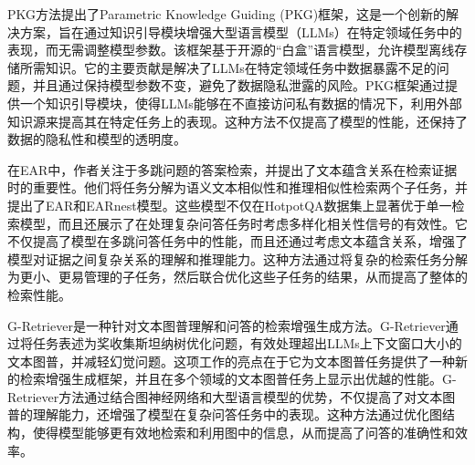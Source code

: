 PKG\cite{luoAugmentedLargeLanguage2023}方法提出了Parametric Knowledge Guiding (PKG)框架，这是一个创新的解决方案，旨在通过知识引导模块增强大型语言模型（LLMs）在特定领域任务中的表现，而无需调整模型参数。该框架基于开源的“白盒”语言模型，允许模型离线存储所需知识。它的主要贡献是解决了LLMs在特定领域任务中数据暴露不足的问题，并且通过保持模型参数不变，避免了数据隐私泄露的风险。PKG框架通过提供一个知识引导模块，使得LLMs能够在不直接访问私有数据的情况下，利用外部知识源来提高其在特定任务上的表现。这种方法不仅提高了模型的性能，还保持了数据的隐私性和模型的透明度。

在EAR\cite{luoDivideConquerEntailmentaware2023}中，作者关注于多跳问题的答案检索，并提出了文本蕴含关系在检索证据时的重要性。他们将任务分解为语义文本相似性和推理相似性检索两个子任务，并提出了EAR和EARnest模型。这些模型不仅在HotpotQA数据集上显著优于单一检索模型，而且还展示了在处理复杂问答任务时考虑多样化相关性信号的有效性。它不仅提高了模型在多跳问答任务中的性能，而且还通过考虑文本蕴含关系，增强了模型对证据之间复杂关系的理解和推理能力。这种方法通过将复杂的检索任务分解为更小、更易管理的子任务，然后联合优化这些子任务的结果，从而提高了整体的检索性能。

G-Retriever\cite{heGRetrieverRetrievalAugmentedGeneration2024}是一种针对文本图普理解和问答的检索增强生成方法。G-Retriever通过将任务表述为奖收集斯坦纳树优化问题，有效处理超出LLMs上下文窗口大小的文本图普，并减轻幻觉问题。这项工作的亮点在于它为文本图普任务提供了一种新的检索增强生成框架，并且在多个领域的文本图普任务上显示出优越的性能。G-Retriever方法通过结合图神经网络和大型语言模型的优势，不仅提高了对文本图普的理解能力，还增强了模型在复杂问答任务中的表现。这种方法通过优化图结构，使得模型能够更有效地检索和利用图中的信息，从而提高了问答的准确性和效率。

